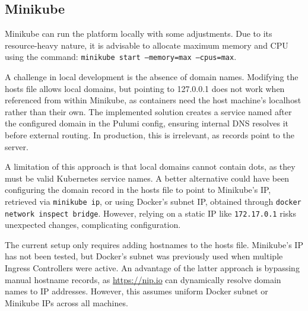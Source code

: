 \subsection{Minikube}
Minikube can run the platform locally with some adjustments. Due to its resource-heavy nature, it is advisable to allocate maximum memory and CPU using the command: \texttt{minikube start --memory=max --cpus=max}.

A challenge in local development is the absence of domain names. Modifying the hosts file allows local domains, but pointing to 127.0.0.1 does not work when referenced from within Minikube, as containers need the host machine's localhost rather than their own. The implemented solution creates a service named after the configured domain in the Pulumi config, ensuring internal DNS resolves it before external routing. In production, this is irrelevant, as records point to the server.

A limitation of this approach is that local domains cannot contain dots, as they must be valid Kubernetes service names. A better alternative could have been configuring the domain record in the hosts file to point to Minikube's IP, retrieved via \texttt{minikube ip}, or using Docker's subnet IP, obtained through \texttt{docker network inspect bridge}. However, relying on a static IP like \texttt{172.17.0.1} risks unexpected changes, complicating configuration.

The current setup only requires adding hostnames to the hosts file. Minikube's IP has not been tested, but Docker's subnet was previously used when multiple Ingress Controllers were active. An advantage of the latter approach is bypassing manual hostname records, as \url{https://nip.io} can dynamically resolve domain names to IP addresses. However, this assumes uniform Docker subnet or Minikube IPs across all machines.

